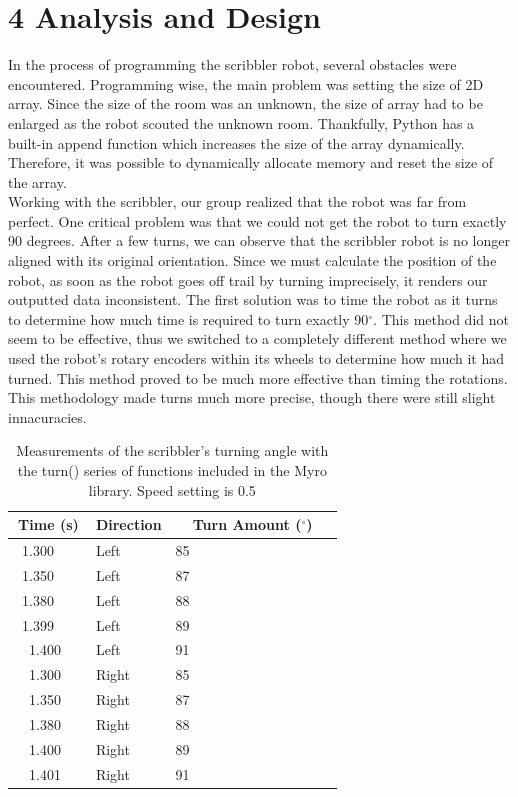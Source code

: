 \documentclass[12pt]{article}
\begin{document}
\newpage

\section*{\fontsize{16}{16}\textsf{4 Analysis and Design}}
\onehalfspacing

In the process of programming the scribbler robot, several obstacles were encountered. Programming wise, the main problem was setting the size of 2D array. Since the size of the room was an unknown, the size of array had to be enlarged as the robot scouted the unknown room. Thankfully, Python has a built-in append function which increases the size of the array dynamically\cite{kun}. Therefore, it was possible to dynamically allocate memory and reset the size of the array.\\

Working with the scribbler, our group realized that the robot was far from perfect. One critical problem was that we could not get the robot to turn exactly 90 degrees. After a few turns, we can observe that the scribbler robot is no longer aligned with its original orientation. Since we must calculate the position of the robot, as soon as the robot goes off trail by turning imprecisely, it renders our outputted data inconsistent. The first solution was to time the robot as it turns to determine how much time is required to turn exactly 90$^\circ$. This method did not seem to be effective, thus we switched to a completely different method where we used the robot’s rotary encoders within its wheels to determine how much it had turned. This method proved to be much more effective than timing the rotations. This methodology made turns much more precise, though there were still slight innacuracies.\\

\begin{table}[ht]
\centering
  \caption{Measurements of the scribbler's turning angle with the turn() series of functions included in the Myro library. Speed setting is 0.5}
  \begin{tabular}{clc}
  Time (s) & Direction & Turn Amount ($^\circ$) \\ \hline
  1.300    & Left      & 85                     \\
  1.350    & Left      & 87                     \\
  1.380    & Left      & 88                     \\
  1.399    & Left      & 89                     \\
  1.400    & Left      & 91                     \\
  1.300    & Right     & 85                     \\
  1.350    & Right     & 87                     \\
  1.380    & Right     & 88                     \\
  1.400    & Right     & 89                     \\
  1.401    & Right     & 91                     \\ \hline
  \end{tabular}
\end{table}
\end{document}
